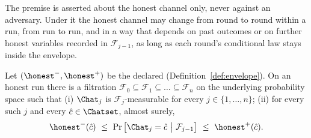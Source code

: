 
The premise is asserted about the honest channel only, never against an
adversary. Under it the honest channel may change from round to round within
a run, from run to run, and in a way that depends on past outcomes or on
further honest variables recorded in $\mathcal{F}_{j-1}$, as long as each
round's conditional law stays inside the envelope.

\begin{assumption}\label{ass:hon-env}
Let $({\honest}^{-},{\honest}^{+})$ be the declared 
(Definition~\ref{def:envelope}). On an honest run there is a filtration
$\mathcal{F}_0\subseteq\mathcal{F}_1\subseteq\dots\subseteq\mathcal{F}_n$ on
the underlying probability space such that
(i) $\Chat_j$ is $\mathcal{F}_j$-measurable for every $j\in\{1,\dots,n\}$;
(ii) for every such $j$ and every $\hat c\in\Chatset$, almost surely,
\begin{equation}\label{eq:hon-env}
  {\honest}^{-}(\hat c)\ \le\
  \Pr\big[\Chat_j=\hat c\ \big|\ \mathcal{F}_{j-1}\big]\ \le\
  {\honest}^{+}(\hat c).
\end{equation}
\end{assumption}
